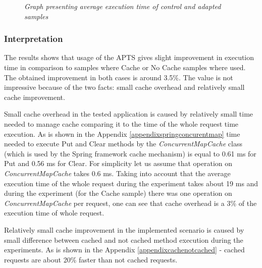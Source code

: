 \documentclass[12pt,a4paper]{article}
\begin{document}
\begin{figure}[!htb]
\centering
{}
\caption{\textit{Graph presenting average execution time of control and adapted samples}} \label{cacheEvalResutlsGraph}
\end{figure}


\subsubsection{Interpretation} 

The results shows that usage of the APTS gives slight improvement in execution time in comparison to samples where Cache or No Cache samples where used. The obtained improvement in both cases is around 3.5\%. The value is not impressive because of the two facts: small cache overhead and relatively small cache improvement. 

Small cache overhead in the tested application is caused by relatively small time needed to manage cache comparing it to the time of the whole request time execution. As is shown in the Appendix \ref{appendixspringconcurentmap} time needed to execute Put and Clear methods by the \textit{ConcurrentMapCache} class (which is used by the Spring framework cache mechanism) is equal to 0.61 ms for Put and 0.56 ms for Clear. For simplicity let us assume that operation on \textit{ConcurrentMapCache} takes 0.6 ms. Taking into account that the average execution time of the whole request during the experiment takes about 19 ms and during the experiment (for the Cache sample) there was one operation on \textit{ConcurrentMapCache} per request, one can see that cache overhead is a 3\% of the execution time of whole request.  

Relatively small cache improvement in the implemented scenario is caused by small difference between cached and not cached method execution during the experiments. As is shown in the Appendix \ref{appendixcachenotcached} - cached requests are about 20\% faster than not cached requests. 
\end{document}
